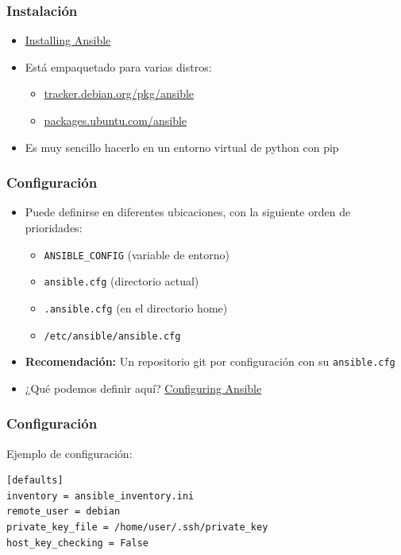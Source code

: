\documentclass[aspectratio=169]{beamer}
\begin{document}
\begin{frame}
  \frametitle{Instalación}
  \begin{itemize}
  \item \href{https://docs.ansible.com/ansible/latest/installation\_guide/intro_installation.html}{Installing Ansible}
  \item Está empaquetado para varias distros:
    \begin{itemize}
    \item \href{https://tracker.debian.org/pkg/ansible}{tracker.debian.org/pkg/ansible}
    \item \href{https://packages.ubuntu.com/ansible}{packages.ubuntu.com/ansible}
    \end{itemize}
  \item Es muy sencillo hacerlo en un entorno virtual de python con pip
  \end{itemize}
\end{frame}

\begin{frame}
  \frametitle{Configuración}
  \begin{itemize}
  \item Puede definirse en diferentes ubicaciones, con la siguiente orden de prioridades:
    \begin{itemize}
    \item \texttt{ANSIBLE\_CONFIG} (variable de entorno)
    \item \texttt{ansible.cfg} (directorio actual)
    \item \texttt{.ansible.cfg} (en el directorio home)      
    \item \texttt{/etc/ansible/ansible.cfg}
    \end{itemize}
  \item \textbf{Recomendación:} Un repositorio git por configuración con su \texttt{ansible.cfg}
  \item ¿Qué podemos definir aquí? \href{https://docs.ansible.com/ansible/latest/installation\_guide/intro_configuration.html}{Configuring Ansible}
  \end{itemize}
\end{frame}

\begin{frame}[fragile]
  \frametitle{Configuración}
  Ejemplo de configuración:
\begin{verbatim}
[defaults]
inventory = ansible_inventory.ini
remote_user = debian
private_key_file = /home/user/.ssh/private_key
host_key_checking = False
\end{verbatim}
\end{frame}
\end{document}
